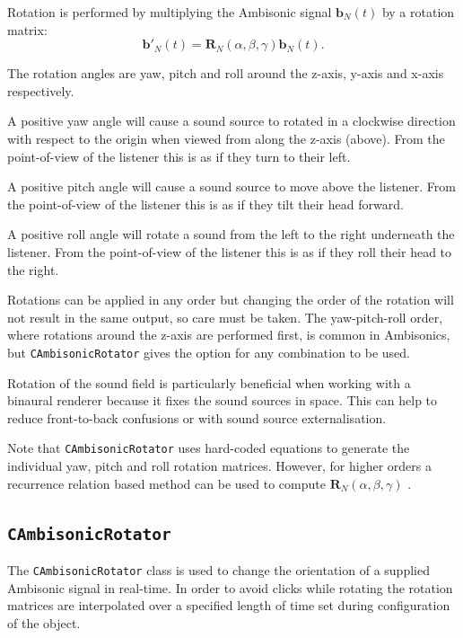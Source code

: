 \documentclass[12pt]{report}
\newcommand{\code}[1]{\texttt{#1}}
\begin{document}
Rotation is performed by multiplying the Ambisonic signal $\textbf{b}_{N}(t)$ by a rotation matrix:
\begin{equation}
    \textbf{b}'_{N}(t) = \textbf{R}_{N}(\alpha, \beta, \gamma) \textbf{b}_{N}(t).
\end{equation}

The rotation angles are yaw, pitch and roll around the z-axis, y-axis and x-axis respectively.

A positive yaw angle will cause a sound source to rotated in a clockwise direction with respect to the origin when viewed from along the z-axis (above). From the point-of-view of the listener this is as if they turn to their left.

A positive pitch angle will cause a sound source to move above the listener. From the point-of-view of the listener this is as if they tilt their head forward.

A positive roll angle will rotate a sound from the left to the right underneath the listener. From the point-of-view of the listener this is as if they roll their head to the right.

Rotations can be applied in any order but changing the order of the rotation will not result in the same output, so care must be taken.
The yaw-pitch-roll order, where rotations around the z-axis are performed first, is common in Ambisonics, but \code{CAmbisonicRotator} gives the option for any combination to be used.

Rotation of the sound field is particularly beneficial when working with a binaural renderer because it fixes the sound sources in space.
This can help to reduce front-to-back confusions or with sound source externalisation.

Note that \code{CAmbisonicRotator} uses hard-coded equations to generate the individual yaw, pitch and roll rotation matrices. However, for higher orders a recurrence relation based method can be used to compute $\textbf{R}_{N}(\alpha, \beta, \gamma)$ \cite{ivanic1996rotation}.

\subsection{\code{CAmbisonicRotator}}

The \code{CAmbisonicRotator} class is used to change the orientation of a supplied Ambisonic signal in real-time. In order to avoid clicks while rotating the rotation matrices are interpolated over a specified length of time set during configuration of the object.
\end{document}
